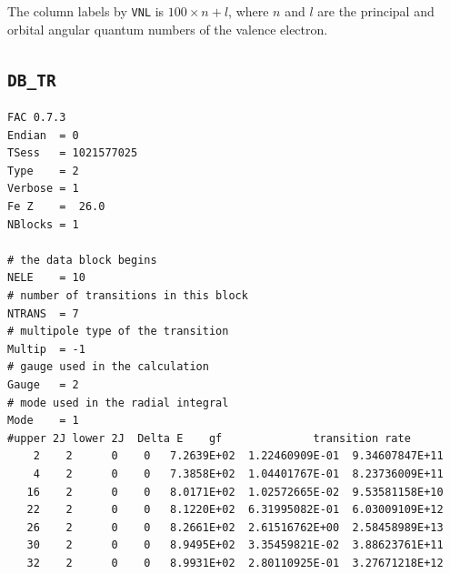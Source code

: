 \documentclass[twoside,letterpaper]{refrep}
\begin{document}
The column labels by \verb|VNL| is $100\times n + l$, where $n$ and $l$ 
are the principal and orbital angular quantum numbers of the valence 
electron.

\subsection{\texttt{DB\_TR}}
\begin{verbatim}
FAC 0.7.3
Endian	= 0
TSess	= 1021577025
Type	= 2
Verbose	= 1
Fe Z	=  26.0
NBlocks	= 1

# the data block begins
NELE	= 10
# number of transitions in this block
NTRANS	= 7
# multipole type of the transition
Multip	= -1
# gauge used in the calculation
Gauge	= 2
# mode used in the radial integral
Mode	= 1
#upper 2J lower 2J  Delta E    gf              transition rate
    2	 2	    0	 0	 7.2639E+02  1.22460909E-01  9.34607847E+11
    4	 2	    0	 0	 7.3858E+02  1.04401767E-01  8.23736009E+11
   16	 2	    0	 0	 8.0171E+02  1.02572665E-02  9.53581158E+10
   22	 2	    0	 0	 8.1220E+02  6.31995082E-01  6.03009109E+12
   26	 2	    0	 0	 8.2661E+02  2.61516762E+00  2.58458989E+13
   30	 2	    0	 0	 8.9495E+02  3.35459821E-02  3.88623761E+11
   32	 2	    0	 0	 8.9931E+02  2.80110925E-01  3.27671218E+12
\end{verbatim}
\end{document}
